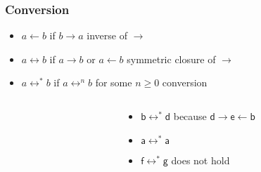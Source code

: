 \documentclass[12pt,aspectratio=169]{beamer}
\newcommand{\m}[1]{\mathsf{#1}}
\begin{document}
\begin{frame}
    \frametitle{Conversion}
    \begin{definition}
        \begin{itemize}
            \item \alert{$a \leftarrow b$} if $b \rightarrow a$ \hfill inverse of $\rightarrow$
            \item \alert{$a \leftrightarrow b$} if $a \rightarrow b$ or $a \leftarrow b$ \hfill symmetric closure of $\rightarrow$
            \item \alert{$a \leftrightarrow^{*} b$} if $a \leftrightarrow^{n} b$ for some $n \geq 0$ \hfill conversion
        \end{itemize}
    \end{definition}

    \begin{example}
    \begin{columns}
        \begin{column}{0.35\textwidth}
            \centering
            \fig
        \end{column}
        \begin{column}{0.5\textwidth}
            \begin{itemize}
                \item $\m{b} \leftrightarrow^{*} \m{d}$ because $\m{d} \rightarrow \m{e} \leftarrow \m{b}$
                \item $\m{a} \leftrightarrow^{*} \m{a}$
                \item $\m{f} \leftrightarrow^{*} \m{g}$ does not hold
            \end{itemize}
        \end{column}
        \end{columns}
    \end{example}

\end{frame}
\end{document}
